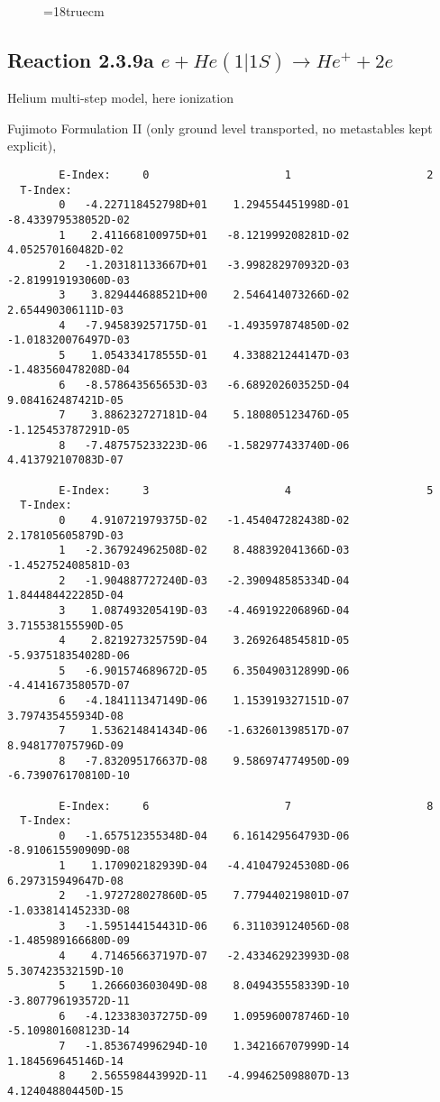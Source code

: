 \begin{figure} \label{2.2.14}
\epsfxsize=18truecm
\end{figure}
\newpage




\subsection{
Reaction 2.3.9a  $e + He(1|1S) \rightarrow  He^+ + 2e $
}
Helium multi-step model, here ionization

 Fujimoto Formulation II (only ground level transported, no metastables
 kept explicit), \cite{kn:Fujimoto}



\begin{verbatim}
        E-Index:     0                     1                     2
  T-Index:
        0   -4.227118452798D+01    1.294554451998D-01   -8.433979538052D-02
        1    2.411668100975D+01   -8.121999208281D-02    4.052570160482D-02
        2   -1.203181133667D+01   -3.998282970932D-03   -2.819919193060D-03
        3    3.829444688521D+00    2.546414073266D-02    2.654490306111D-03
        4   -7.945839257175D-01   -1.493597874850D-02   -1.018320076497D-03
        5    1.054334178555D-01    4.338821244147D-03   -1.483560478208D-04
        6   -8.578643565653D-03   -6.689202603525D-04    9.084162487421D-05
        7    3.886232727181D-04    5.180805123476D-05   -1.125453787291D-05
        8   -7.487575233223D-06   -1.582977433740D-06    4.413792107083D-07

        E-Index:     3                     4                     5
  T-Index:
        0    4.910721979375D-02   -1.454047282438D-02    2.178105605879D-03
        1   -2.367924962508D-02    8.488392041366D-03   -1.452752408581D-03
        2   -1.904887727240D-03   -2.390948585334D-04    1.844484422285D-04
        3    1.087493205419D-03   -4.469192206896D-04    3.715538155590D-05
        4    2.821927325759D-04    3.269264854581D-05   -5.937518354028D-06
        5   -6.901574689672D-05    6.350490312899D-06   -4.414167358057D-07
        6   -4.184111347149D-06    1.153919327151D-07    3.797435455934D-08
        7    1.536214841434D-06   -1.632601398517D-07    8.948177075796D-09
        8   -7.832095176637D-08    9.586974774950D-09   -6.739076170810D-10

        E-Index:     6                     7                     8
  T-Index:
        0   -1.657512355348D-04    6.161429564793D-06   -8.910615590909D-08
        1    1.170902182939D-04   -4.410479245308D-06    6.297315949647D-08
        2   -1.972728027860D-05    7.779440219801D-07   -1.033814145233D-08
        3   -1.595144154431D-06    6.311039124056D-08   -1.485989166680D-09
        4    4.714656637197D-07   -2.433462923993D-08    5.307423532159D-10
        5    1.266603603049D-08    8.049435558339D-10   -3.807796193572D-11
        6   -4.123383037275D-09    1.095960078746D-10   -5.109801608123D-14
        7   -1.853674996294D-10    1.342166707999D-14    1.184569645146D-14
        8    2.565598443992D-11   -4.994625098807D-13    4.124048804450D-15


\end{verbatim}
